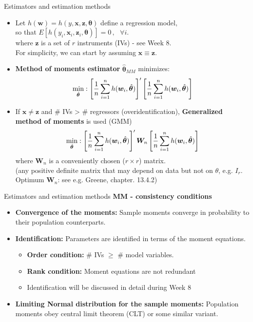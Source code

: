 \documentclass{beamer}
\begin{document}
\begin{frame}{Estimators and estimation methods}
\begin{itemize}
    \item Let $h(\bm{w}) = h(y,\bm{x}, \bm{z}, \bm{\theta})$ define a regression model,
    \\so that $ E [h( y_i, \bm{x}_i, \bm{z}_i, \bm{\theta} )] = 0 \, , ~~~ \forall i.$ 
    \\where $\bm{z}$ is a set of $r$ instruments (IVs) - see Week 8.
    \\For simplicity, we can start by assuming  $\bm{x} \equiv \bm{z}$.
    \item \textbf{Method of moments estimator} $\hat{\bm{\theta}}_{\textit{MM}}$ minimizes:
    $$
    \underset{\hat{\bm{\theta}}}{\textnormal{min}}:
    \left[ \frac{1}{n} \sum_{i=1}^n h (\bm{w}_i,\hat{\bm{\theta}} )
    \right]^{\prime}
    \left[ \frac{1}{n} \sum_{i=1}^n h (\bm{w}_i,\hat{\bm{\theta}} )
    \right]
    $$
    \item If $\bm{x} \neq \bm{z}$ and \# IVs > \# regressors (overidentification), \textbf{Generalized method of moments} is used (GMM)
    $$
    \underset{\hat{\bm{\theta}}}{\textnormal{min}}:
    \left[ \frac{1}{n} \sum_{i=1}^n h (\bm{w}_i,\hat{\bm{\theta}} )
    \right]^{\prime} \bm{W}_n
    \left[ \frac{1}{n} \sum_{i=1}^n h (\bm{w}_i,\hat{\bm{\theta}} )
    \right]
    $$
    where $\bm{W}_n$ is a conveniently chosen ($r \times r$) matrix. 
    \\ \small{(any positive definite matrix that may depend on data but not on $\theta$, e.g. $I_r$. Optimum $\bm{W}_n$: see e.g. Greene, chapter. 13.4.2)}
\end{itemize}
\end{frame}
\begin{frame}{Estimators and estimation methods}
\textbf{MM - consistency conditions}\\
\medskip
\begin{itemize}
  \item \textbf{Convergence of the moments:} Sample moments converge in probability to their population counterparts.
  \medskip
  \item \textbf{Identification:} Parameters are identified in terms of the moment equations.
  \begin{itemize}
      \item \textbf{Order condition:} \# IVs $\geq$ \# model variables.
      \item \textbf{Rank condition:} Moment equations are not redundant
      \item Identification will be discussed in detail during Week 8
  \end{itemize}
  \medskip
  \item \textbf{Limiting Normal distribution for the sample moments:} Population moments obey central limit theorem (CLT) or some similar variant.
\end{itemize}
\end{frame}
\end{document}
